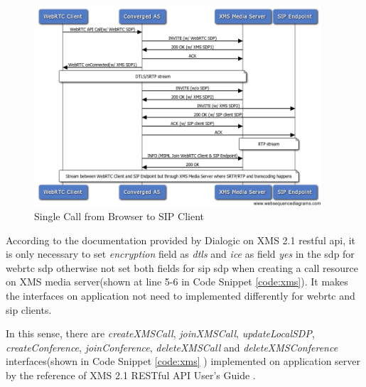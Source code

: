 \begin{figure}
	\centering
    	\includegraphics[width=0.95\textwidth,natwidth=610,natheight=642]{figs/chrome2xms.png}
  	\caption{Single Call from Browser to SIP Client}
  	\label{fig:chrome2xms}
\end{figure}

\par According to the documentation provided by Dialogic on XMS 2.1 \gls{rest}ful \gls{api}\cite{doc:xms_webapi}, it is only necessary to set \textit{encryption} field as \textit{dtls} and \textit{ice} as field \textit{yes} in the \gls{sdp} for \gls{webrtc} \gls{sdp} otherwise not set both fields for \gls{sip} \gls{sdp} when creating a call resource on XMS media server(shown at line 5-6 in Code Snippet \ref{code:xms}). It makes the interfaces on application not need to implemented differently for \gls{webrtc} and \gls{sip} clients.

\par In this sense, there are \textit{createXMSCall}, \textit{joinXMSCall}, \textit{updateLocalSDP}, \textit{createConference}, \textit{joinConference}, \textit{deleteXMSCall} and \textit{deleteXMSConference} interfaces(shown in Code Snippet \ref{code:xms} ) implemented on application server by the reference of XMS 2.1 RESTful API User's Guide \cite{doc:xms_webapi}.

